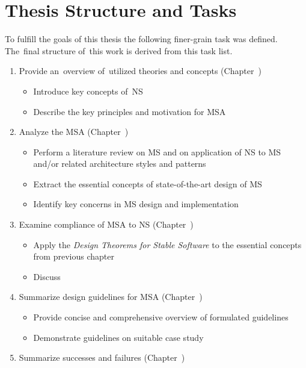 \documentclass[thesis=M,english,hidelinks]{FITthesis}[2012/10/20]
\begin{document}
\section{Thesis Structure and Tasks}
To fulfill the goals of this thesis the following finer-grain task was defined. The~final structure of~this work is derived from this task list.
\begin{enumerate}
	\item Provide an~overview of~utilized theories and concepts (Chapter~\textit{})
	\begin{itemize}
		\item Introduce key concepts of~\acrlong{NS}
		\item Describe the key principles and motivation for \acrlong{MSA}
	\end{itemize}

	\item Analyze the \acrlong{MSA} (Chapter~\textit{})
	\begin{itemize}
		\item Perform a literature review on \acrshort{MS} and on application of \acrshort{NS} to \acrshort{MS} and/or related architecture styles and patterns
        \item Extract the essential concepts of state-of-the-art design of \acrshort{MS}
		\item Identify key concerns in \acrshort{MS} design and implementation
	\end{itemize}

	\item Examine compliance of \acrlong{MSA} to \acrlong{NS} (Chapter~\textit{})
	\begin{itemize}
		\item Apply the \textit{Design Theorems for Stable Software} to the essential concepts from previous chapter
		\item Discuss 
	\end{itemize}	

	\item Summarize design guidelines for \acrshort{MSA} (Chapter~\textit{})
	\begin{itemize}
		\item Provide concise and comprehensive overview of formulated guidelines
		\item Demonstrate guidelines on suitable case study
	\end{itemize}
	
	\item Summarize successes and failures (Chapter~\textit{})
\end{enumerate}
\end{document}
